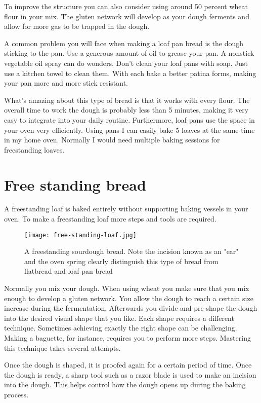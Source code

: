 To improve the structure you can also consider using around 50 percent
wheat flour in your mix. The gluten network will develop as your
dough ferments and allow for more gas to be trapped in the dough.

A common problem you will face when making a loaf pan bread is
the dough sticking to the pan. Use a generous amount of oil to grease
your pan. A nonstick vegetable oil spray can do wonders.
Don't clean your loaf pans with soap. Just use a kitchen towel
to clean them. With each bake a better patina forms, making your
pan more and more stick resistant.

What's amazing about this type of bread is that it works
with every flour. The overall time to work the dough is probably
less than 5 minutes, making it very easy to integrate
into your daily routine. Furthermore, loaf pans use the space
in your oven very efficiently. Using pans I can
easily bake 5 loaves at the same time in my home oven.
Normally I would need multiple baking sessions for
freestanding loaves.

\section{Free standing bread}

A freestanding loaf is baked entirely without supporting
baking vessels in your oven. To make a freestanding loaf more steps
and tools are required.

\begin{figure}[!htb]
  \texttt{[image: free-standing-loaf.jpg]}
  \centering
  \caption{A freestanding sourdough bread. Note the incision known as an "ear" and the oven spring clearly
  distinguish this type of bread from flatbread and loaf pan bread}
\end{figure}

Normally you mix your dough. When using wheat you make sure
that you mix enough to develop a gluten network.
You allow the dough to reach
a certain size increase during the fermentation. Afterwards you divide and pre-shape
the dough into the desired visual shape that you like.
Each shape requires a different technique. Sometimes achieving
exactly the right shape can be challenging. Making a baguette,
for instance, requires you to perform more steps. Mastering this
technique takes several attempts.

Once the dough is shaped, it is proofed again for a certain
period of time. Once the dough is ready, a sharp tool such
as a razor blade is used to make an incision into the dough.
This helps control how the dough opens up during the baking process.

